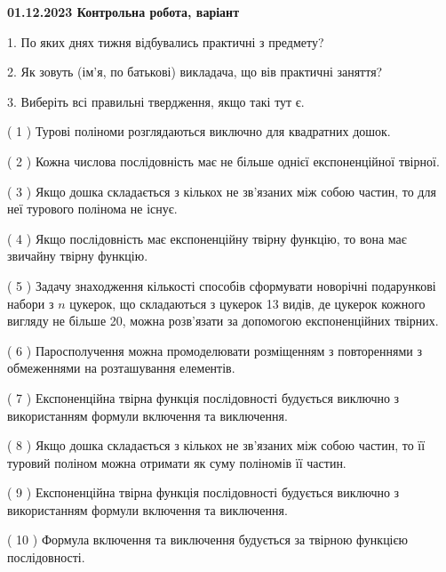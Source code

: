 \documentclass[12pt, ukrainian]{article}
\begin{document}
\vspace{4mm}
\newpage
\begin {large}

\textbf{01.12.2023 Контрольна робота, варіант  }\par


{
1. По яких днях тижня відбувались практичні з предмету?



\vspace{5mm}
2. Як зовуть (ім'я, по батькові) викладача, що вів практичні заняття?



\vspace{5mm}
3. Виберіть всі правильні твердження, якщо такі тут є.\par
\vspace{2mm}
( 1 ) Турові поліноми розглядаються виключно для квадратних дошок.%

( 2 ) Кожна числова послідовність має не більше однієї  експоненційної твірної.%

( 3 ) Якщо дошка складається з кількох не зв’язаних між собою частин, то для неї турового полінома не існує.%

( 4 ) Якщо послідовність має експоненційну твірну функцію, то вона має звичайну твірну функцію.%

( 5 ) Задачу знаходження кількості способів сформувати новорічні подарункові набори з $n$ цукерок, що складаються з цукерок 13 видів, де цукерок кожного вигляду не більше 20, можна розв’язати за допомогою експоненційних твірних.%

( 6 ) Паросполучення можна промоделювати розміщенням з повтореннями з обмеженнями на розташування елементів.%

( 7 ) Експоненційна твірна функція послідовності будується виключно з використанням формули включення та виключення.%

( 8 ) Якщо дошка складається з кількох не зв’язаних між собою частин, то її туровий поліном можна отримати як суму поліномів її частин.%

( 9 ) Експоненційна твірна функція послідовності будується виключно з використанням формули включення та виключення.%

( 10 ) Формула включення та виключення будується за твірною функцією послідовності.%
}
\end {large}
\end{document}
